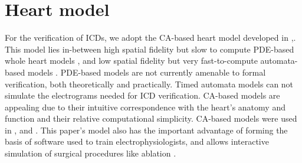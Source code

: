 \section{Heart model}
\label{sec:heartcellularautomata}
For the verification of \acp{ICD},
we adopt the \acf{CA}-based heart model developed in \cite{Spector11_Emergence},\cite{CorreaEtAl11_EGMFractionation}.
This model lies in-between high spatial fidelity but slow to compute PDE-based whole heart models  \cite{vfiborganization_Tusscher07}, and low spatial fidelity but very fast-to-compute automata-based models \cite{TECS}.
PDE-based models are not currently amenable to formal verification, both theoretically and practically.
Timed automata models can not simulate the electrograms needed for \ac{ICD} verification.
\ac{CA}-based models are appealing due to their intuitive correspondence with the heart's anatomy and function and their relative computational simplicity.
\ac{CA}-based models were used in \cite{Mery},\cite{BartocciCBESG09_HIOAmodeling} and \cite{Chen14_Quantitative}.
This paper's model also has the important advantage of forming the basis of software used to train electrophysiologists, and allows interactive simulation of surgical procedures like ablation \cite{visibleep}.
%

